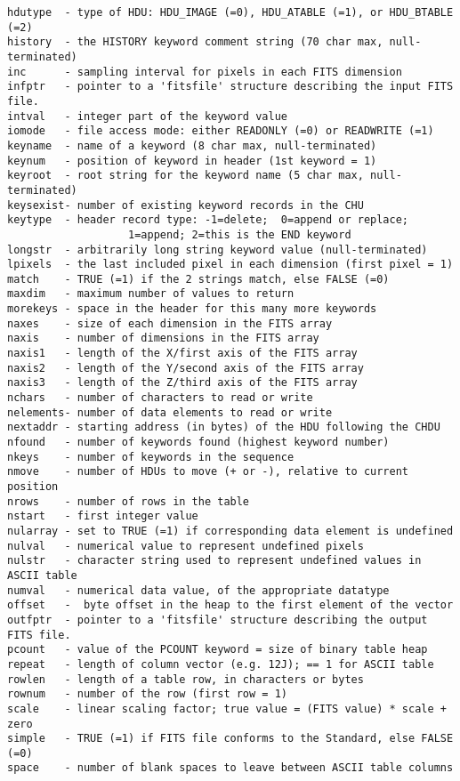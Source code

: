 \begin{verbatim}
hdutype  - type of HDU: HDU_IMAGE (=0), HDU_ATABLE (=1), or HDU_BTABLE (=2)
history  - the HISTORY keyword comment string (70 char max, null-terminated)
inc      - sampling interval for pixels in each FITS dimension
infptr   - pointer to a 'fitsfile' structure describing the input FITS file.
intval   - integer part of the keyword value
iomode   - file access mode: either READONLY (=0) or READWRITE (=1)
keyname  - name of a keyword (8 char max, null-terminated)
keynum   - position of keyword in header (1st keyword = 1)
keyroot  - root string for the keyword name (5 char max, null-terminated)
keysexist- number of existing keyword records in the CHU
keytype  - header record type: -1=delete;  0=append or replace;
                   1=append; 2=this is the END keyword
longstr  - arbitrarily long string keyword value (null-terminated)
lpixels  - the last included pixel in each dimension (first pixel = 1)
match    - TRUE (=1) if the 2 strings match, else FALSE (=0)
maxdim   - maximum number of values to return
morekeys - space in the header for this many more keywords
naxes    - size of each dimension in the FITS array
naxis    - number of dimensions in the FITS array
naxis1   - length of the X/first axis of the FITS array
naxis2   - length of the Y/second axis of the FITS array
naxis3   - length of the Z/third axis of the FITS array
nchars   - number of characters to read or write
nelements- number of data elements to read or write
nextaddr - starting address (in bytes) of the HDU following the CHDU
nfound   - number of keywords found (highest keyword number)
nkeys    - number of keywords in the sequence
nmove    - number of HDUs to move (+ or -), relative to current position
nrows    - number of rows in the table
nstart   - first integer value
nularray - set to TRUE (=1) if corresponding data element is undefined
nulval   - numerical value to represent undefined pixels
nulstr   - character string used to represent undefined values in ASCII table
numval   - numerical data value, of the appropriate datatype
offset   -  byte offset in the heap to the first element of the vector
outfptr  - pointer to a 'fitsfile' structure describing the output FITS file.
pcount   - value of the PCOUNT keyword = size of binary table heap
repeat   - length of column vector (e.g. 12J); == 1 for ASCII table
rowlen   - length of a table row, in characters or bytes
rownum   - number of the row (first row = 1)
scale    - linear scaling factor; true value = (FITS value) * scale + zero
simple   - TRUE (=1) if FITS file conforms to the Standard, else FALSE (=0)
space    - number of blank spaces to leave between ASCII table columns

\end{verbatim}
